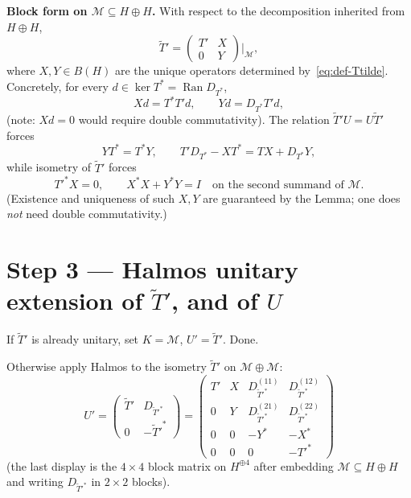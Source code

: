 \documentclass[11pt]{article}
\begin{document}
\medskip
\noindent
\textbf{Block form on \(\mathcal{M}\subseteq H\oplus H\).}
With respect to the decomposition inherited from \(H\oplus H\),
\begin{equation}
\label{eq:Ttilde-block}
\boxed{
\widetilde{T}'
=
\begin{pmatrix}
T' & X \\
0 & Y
\end{pmatrix}
\Big|_{\mathcal{M}},
}
\end{equation}
where \(X,Y\in B(H)\) are the unique operators determined by~\eqref{eq:def-Ttilde}.
Concretely, for every \(d\in\ker T^*=\operatorname{Ran}D_{T^*}\),
\begin{equation}
\label{eq:XY-defect}
Xd=T^*T'd,
\qquad
Yd=D_{T^*}T'd,
\end{equation}
(note: \(Xd=0\) would require double commutativity). The relation
\(\widetilde{T}'U=U\widetilde{T}'\) forces
\begin{equation}
\label{eq:XY-comm}
YT^*=T^*Y,
\qquad
T'D_{T^*}-X T^*=TX+D_{T^*}Y,
\end{equation}
while isometry of \(\widetilde{T}'\) forces
\begin{equation}
\label{eq:XY-isom}
{T'}^*X=0,
\qquad
X^*X+Y^*Y=I
\quad\text{on the second summand of \(\mathcal{M}\)}.
\end{equation}
(Existence and uniqueness of such \(X,Y\) are guaranteed by the Lemma; one does
\emph{not} need double commutativity.)

\section*{Step 3 --- Halmos unitary extension of \(\widetilde{T}'\), and of \(U\)}

If \(\widetilde{T}'\) is already unitary, set \(K=\mathcal{M}\), \(U'= \widetilde{T}'\). Done.

Otherwise apply Halmos to the isometry \(\widetilde{T}'\) on \(\mathcal{M}\oplus\mathcal{M}\):
\begin{equation}
\label{eq:Halmos-Tp}
\boxed{
U'
=
\begin{pmatrix}
\widetilde{T}' & D_{\widetilde{T}'^*} \\
0 & -{\widetilde{T}'}^*
\end{pmatrix}
=
\begin{pmatrix}
T' & X & D_{\widetilde{T}'^*}^{(11)} & D_{\widetilde{T}'^*}^{(12)} \\
0 & Y & D_{\widetilde{T}'^*}^{(21)} & D_{\widetilde{T}'^*}^{(22)} \\
0 & 0 & -Y^* & -X^* \\
0 & 0 & 0 & -{T'}^*
\end{pmatrix}
}
\end{equation}
(the last display is the \(4\times 4\) block matrix on \(H^{\oplus 4}\) after embedding
\(\mathcal{M}\subseteq H\oplus H\) and writing \(D_{\widetilde{T}'^*}\) in \(2\times 2\) blocks).
\end{document}
